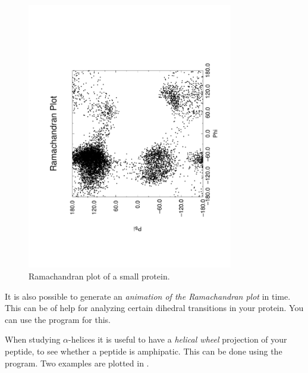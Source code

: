 \begin{figure}
\centerline{
{\includegraphics[width=9cm,angle=270]{plots/rama}}}
\caption{Ramachandran plot of a small protein.}
\label{fig:rama}
\end{figure}

It is also possible to generate an {\em animation of the Ramachandran plot} 
in time. This can be of help for analyzing certain dihedral transitions 
in your protein. You can use the program {\tt {}} for this.

When studying $\alpha$-helices 
it is useful to have a {\em helical wheel} projection
of your peptide, to see whether a peptide is amphipatic. This can be done
using the {\tt {}} program. Two examples are 
plotted in .


